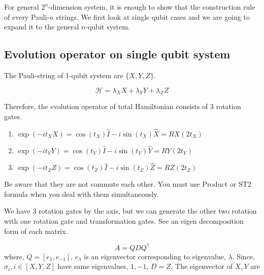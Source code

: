 For general $2^n$-dimension system, it is enough to show that the construction rule of every Pauli-$n$ strings.
We first look at single qubit cases and we are going to expand it to the general $n$-qubit system.

\subsection{Evolution operator on single qubit system}

The Pauli-string of 1-qubit system are $\{X, Y, Z\}$.

\begin{equation}
    \mathcal{H} = \lambda_{X} X + \lambda_{Y} Y + \lambda_{Z} Z
\end{equation}

Therefore, the evolution operator of total Hamiltonian consists of 
3 rotation gates.

\begin{enumerate}
    \item $\exp(-i t_{X} X) = \cos(t_{X}) \hat{I} - i \sin(t_{X}) \hat{X} = RX(2t_{X})$
    \item $\exp(-i t_{Y} Y) = \cos(t_{Y}) \hat{I} - i \sin(t_{Y}) \hat{Y} = RY(2t_{Y})$
    \item $\exp(-i t_{Z} Z) = \cos(t_{Z}) \hat{I} - i \sin(t_{Z}) \hat{Z} = RZ(2t_{Z})$
\end{enumerate}

Be aware that they are not commute each other. 
You must use Product or ST2 formula when you deal with them simultaneously.

We have 3 rotation gates by the axis, but we can generate the other two rotation with one rotation gate and 
transformation gates. 
See an eigen decomposition form of each matrix.

\begin{equation}
    A = Q D Q^{\dagger}
\end{equation}
where, $Q = [e_1, e_{-1}]$, $e_{\lambda}$ is an eigenvector corresponding to eigenvalue, $\lambda$.
Since, $\sigma_{i}, i \in [X, Y, Z]$ have same eigenvalues, $1, -1$, $D = Z$.
The eigenvector of $X, Y$ are


